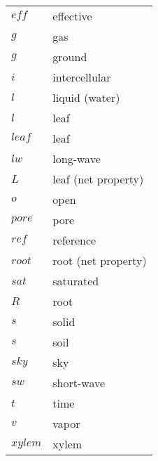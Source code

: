 \begin{longtable}{p{}p{}}
	${\mathit{eff}}$ 		& effective \\
	$g$ 					& gas \\
	$g$ 					& ground \\	
	$i$ 					& intercellular \\
	$l$ 					& liquid (water) \\
	$l$ 					& leaf \\	
	$\textit{leaf}$ 		& leaf \\		
	$lw$ 					& long-wave \\	
	$L$ 					& leaf (net property) \\	
	$o$						& open \\
	$\mathit{pore}$			& pore \\
	$\mathit{ref}$ 			& reference \\
	$\mathit{root}$ 		& root (net property) \\
	$\mathit{sat}$ 			& saturated \\
	$R$ 					& root \\	
	$s$ 					& solid \\
	$s$ 					& soil \\	
	$sky$ 					& sky\\		
	$sw$ 					& short-wave \\	
	$t$ 					& time \\
	$v$ 					& vapor \\
	$xylem$ 				& xylem \\	
\end{longtable}
\vfill
\bigskip
%


